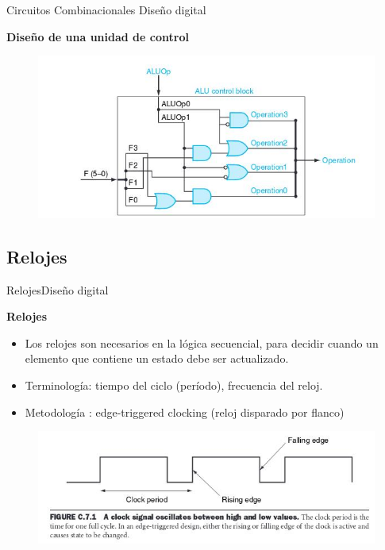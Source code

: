 \documentclass[aspectratio=169,compress]{beamer}
\begin{document}
\begin{footnotesize}
\begin{frame} {Circuitos Combinacionales} {Diseño digital}
\begin{center}\textbf{Diseño de una unidad de control}\end{center}
\begin{figure}
\includegraphics[scale=0.4]{images/control.jpg} 
\end{figure}
\end{frame}


\subsection{Relojes}

\begin{frame}{Relojes}{Diseño digital}
\begin{center}\textbf{Relojes}\end{center}
\begin{itemize}
\item Los relojes son necesarios en la lógica secuencial, para decidir cuando un elemento que contiene un estado debe ser actualizado.
\item Terminología: tiempo del ciclo (período), frecuencia del reloj.
\item Metodología : edge-triggered clocking (reloj disparado por flanco)
\end{itemize}
\begin{figure}
\includegraphics[scale=0.4]{images/reloj.jpg} 
\end{figure}
\end{frame}



\end{footnotesize}
\end{document}
